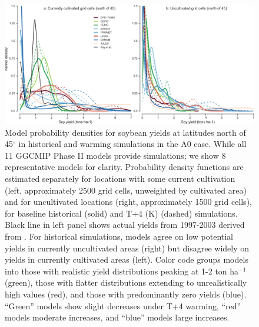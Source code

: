 \documentclass[gmd, manuscript]{copernicus} %
\begin{document}
\begin{figure}[ht]
\centering
  \includegraphics[width=15cm]{figures/soy_highlats.png}
  \caption{
  Model probability densities for soybean yields at latitudes north of 45$^\circ$ in historical and warming simulations in the A0 case. 
  While all 11 GGCMIP Phase II models provide simulations; we show 8 representative models for clarity.
  Probability density functions are estimated separately for locations with some current cultivation (left, approximately 2500 grid cells, unweighted by cultivated area) and for uncultivated locations (right, approximately 1500 grid cells), for baseline historical (solid) and T+4 (K) (dashed) simulations. 
  Black line in left panel shows actual yields from 1997-2003 derived from \cite{Ray2012}. 
  For historical simulations, models agree on low potential yields in currently uncultivated areas (right) but disagree widely on yields in currently cultivated areas (left). 
  Color code groups models into those with realistic yield distributions peaking at 1-2 ton ha$^{-1}$ (green), those with flatter distributions extending to unrealistically high values (red), and those with predominantly zero yields (blue). 
  ``Green'' models show slight decreases under T+4 warming, ``red'' models moderate increases, and ``blue'' models large increases. 
  }
\label{fig:highlat}
\end{figure}
\end{document}

